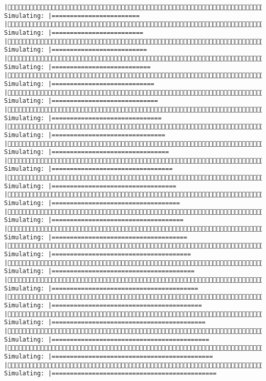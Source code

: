 \documentclass[]{article}
\begin{document}
\begin{verbatim}
|(3/4) Simulating: |========================                               |(3/4) Simulating: |=========================                              |(3/4) Simulating: |==========================                             |(3/4) Simulating: |===========================                            |(3/4) Simulating: |============================                           |(3/4) Simulating: |=============================                          |(3/4) Simulating: |==============================                         |(3/4) Simulating: |===============================                        |(3/4) Simulating: |================================                       |(3/4) Simulating: |=================================                      |(3/4) Simulating: |==================================                     |(3/4) Simulating: |===================================                    |(3/4) Simulating: |====================================                   |(3/4) Simulating: |=====================================                  |(3/4) Simulating: |======================================                 |(3/4) Simulating: |=======================================                |(3/4) Simulating: |========================================               |(3/4) Simulating: |=========================================              |(3/4) Simulating: |==========================================             |(3/4) Simulating: |===========================================            |(3/4) Simulating: |============================================           |(3/4) Simulating: |=============================================          
\end{verbatim}
\end{document}
